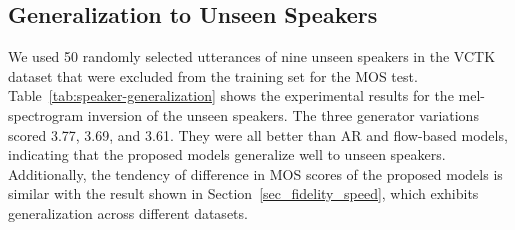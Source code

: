 \subsection{Generalization to Unseen Speakers}

We used 50 randomly selected utterances of nine unseen speakers in the VCTK dataset that were excluded from the training set for the MOS test. Table~\ref{tab:speaker-generalization} shows the experimental results for the mel-spectrogram inversion of the unseen speakers. The three generator variations scored 3.77, 3.69, and 3.61. They were all better than AR and flow-based models, indicating that the proposed models generalize well to unseen speakers. Additionally, the tendency of difference in MOS scores of the proposed models is similar with the result shown in Section~\ref{sec_fidelity_speed}, which exhibits generalization across different datasets.

